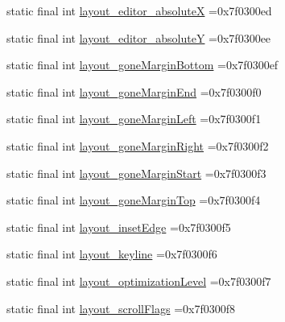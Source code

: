 \begin{DoxyCompactItemize}
\item 
static final int \mbox{\hyperlink{classbr_1_1unb_1_1cic_1_1mp_1_1marketmaster_1_1test_1_1R_1_1attr_a418de57d7781d54e504a4ecb87ed03ab}{layout\+\_\+editor\+\_\+absoluteX}} =0x7f0300ed
\item 
static final int \mbox{\hyperlink{classbr_1_1unb_1_1cic_1_1mp_1_1marketmaster_1_1test_1_1R_1_1attr_aa628a9a6431ab470668b2809cd77615d}{layout\+\_\+editor\+\_\+absoluteY}} =0x7f0300ee
\item 
static final int \mbox{\hyperlink{classbr_1_1unb_1_1cic_1_1mp_1_1marketmaster_1_1test_1_1R_1_1attr_a12359a4ca4a0cd5f59cc87abb14e490a}{layout\+\_\+gone\+Margin\+Bottom}} =0x7f0300ef
\item 
static final int \mbox{\hyperlink{classbr_1_1unb_1_1cic_1_1mp_1_1marketmaster_1_1test_1_1R_1_1attr_a325794a21ef2abc62ab991891ce932f7}{layout\+\_\+gone\+Margin\+End}} =0x7f0300f0
\item 
static final int \mbox{\hyperlink{classbr_1_1unb_1_1cic_1_1mp_1_1marketmaster_1_1test_1_1R_1_1attr_a1cd12209b618ef5871e7fa5a0fa52050}{layout\+\_\+gone\+Margin\+Left}} =0x7f0300f1
\item 
static final int \mbox{\hyperlink{classbr_1_1unb_1_1cic_1_1mp_1_1marketmaster_1_1test_1_1R_1_1attr_a03b83cf0f311df410da1175763ab2cd6}{layout\+\_\+gone\+Margin\+Right}} =0x7f0300f2
\item 
static final int \mbox{\hyperlink{classbr_1_1unb_1_1cic_1_1mp_1_1marketmaster_1_1test_1_1R_1_1attr_a91a5e4a66b1e94be47dbba38d627adfd}{layout\+\_\+gone\+Margin\+Start}} =0x7f0300f3
\item 
static final int \mbox{\hyperlink{classbr_1_1unb_1_1cic_1_1mp_1_1marketmaster_1_1test_1_1R_1_1attr_ae8bcc46cc0922e714c02f419dbf5366b}{layout\+\_\+gone\+Margin\+Top}} =0x7f0300f4
\item 
static final int \mbox{\hyperlink{classbr_1_1unb_1_1cic_1_1mp_1_1marketmaster_1_1test_1_1R_1_1attr_a3c0ab1b3ef2d1d6414dd1a457d4e01f8}{layout\+\_\+inset\+Edge}} =0x7f0300f5
\item 
static final int \mbox{\hyperlink{classbr_1_1unb_1_1cic_1_1mp_1_1marketmaster_1_1test_1_1R_1_1attr_aa06a6f092efbc691cfe407a54581be8a}{layout\+\_\+keyline}} =0x7f0300f6
\item 
static final int \mbox{\hyperlink{classbr_1_1unb_1_1cic_1_1mp_1_1marketmaster_1_1test_1_1R_1_1attr_a24550383a5de19ef1138bcba6ca07b64}{layout\+\_\+optimization\+Level}} =0x7f0300f7
\item 
static final int \mbox{\hyperlink{classbr_1_1unb_1_1cic_1_1mp_1_1marketmaster_1_1test_1_1R_1_1attr_a6f22dd41c42ba8a660634a65c2475654}{layout\+\_\+scroll\+Flags}} =0x7f0300f8

\end{DoxyCompactItemize}
